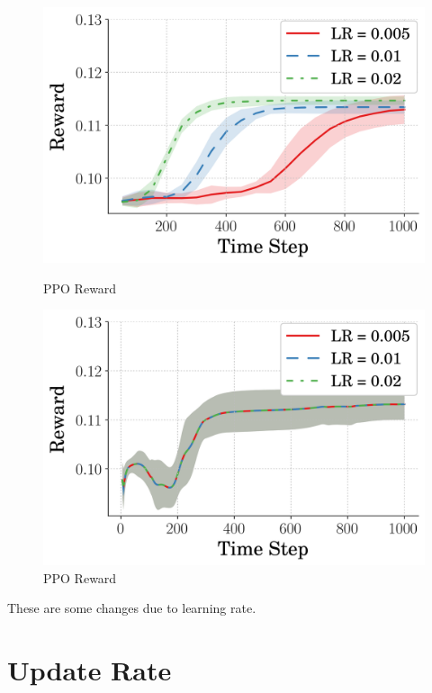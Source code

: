 \documentclass[10pt,twocolumn,letterpaper]{article}
\begin{document}
\begin{figure}[tb]
\centering
\begin{minipage}[b]{.45\textwidth}
        \includegraphics[width=\linewidth]{figures/comp_learning_rate/avg_rew_ppo.png}
        \caption{PPO Reward}\label{label-a}
\end{minipage}
\hfill
\begin{minipage}[b]{.45\textwidth}
        \includegraphics[width=\linewidth]{figures/comp_learning_rate/avg_rew_td3.png}
        \caption{PPO Reward}\label{label-b}
\end{minipage}
\end{figure}
        
These are some changes due to learning rate.

\section{Update Rate}
\label{app:ur_changes}
\end{document}
